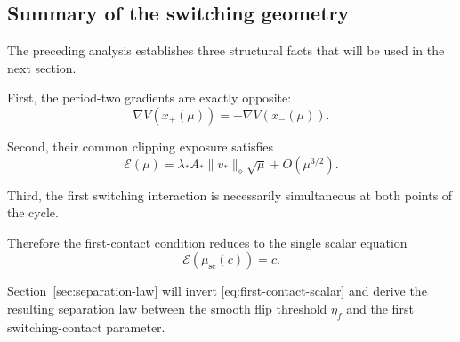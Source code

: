 \subsection{Summary of the switching geometry}
\label{subsec:switching-geometry-summary}

The preceding analysis establishes three structural facts that will
be used in the next section.

First, the period-two gradients are exactly opposite:
\begin{equation}
\nabla V(x_+(\mu))
=
-\nabla V(x_-(\mu)).
\label{eq:summary-opposite}
\end{equation}

Second, their common clipping exposure satisfies
\begin{equation}
\mathscr E(\mu)
=
\lambda_*A_*
\|v_*\|_\diamond
\sqrt{\mu}
+
O(\mu^{3/2}).
\label{eq:summary-exposure}
\end{equation}

Third, the first switching interaction is necessarily simultaneous
at both points of the cycle.

Therefore the first-contact condition reduces to the single scalar
equation
\begin{equation}
\mathscr E(\mu_{\mathrm{sc}}(c))
=
c.
\label{eq:first-contact-scalar}
\end{equation}

Section~\ref{sec:separation-law} will invert
\eqref{eq:first-contact-scalar} and derive the resulting separation
law between the smooth flip threshold $\eta_f$ and the first
switching-contact parameter.

